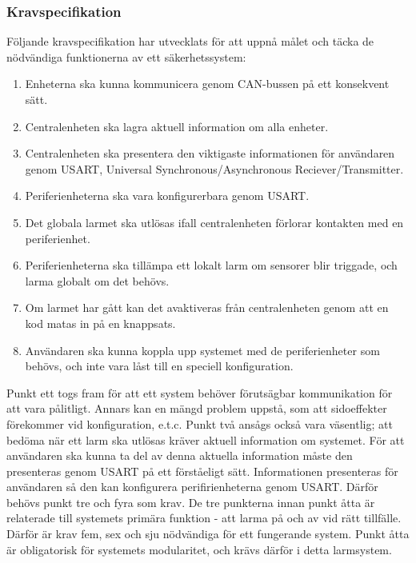 \subsubsection{Kravspecifikation}
\label{sec:kravspec}
Följande kravspecifikation har utvecklats för att uppnå målet och täcka de nödvändiga funktionerna av ett säkerhetssystem:
\begin{enumerate}
    \item Enheterna ska kunna kommunicera genom CAN-bussen på ett konsekvent sätt.
    \label{itm:krav1}
    \item Centralenheten ska lagra aktuell information om alla enheter.
    \label{itm:krav2}
    \item Centralenheten ska presentera den viktigaste informationen för 
    användaren genom USART, Universal Synchronous/Asynchronous Reciever/Transmitter.
    \label{itm:krav3}
    \item Periferienheterna ska vara konfigurerbara genom USART.
    \label{itm:krav4}
    \item Det globala larmet ska utlösas ifall centralenheten förlorar kontakten med en periferienhet.
    \label{itm:krav5}
    \item Periferienheterna ska tillämpa ett lokalt larm om sensorer blir triggade, och larma globalt om det behövs.
    \label{itm:krav6}
    \item Om larmet har gått kan det avaktiveras från centralenheten genom att en kod matas in på en knappsats.
    \label{itm:krav7}
    \item Användaren ska kunna koppla upp systemet med de periferienheter som behövs, och inte vara låst till en speciell konfiguration.
    \label{itm:krav8}
\end{enumerate}
Punkt ett togs fram för att ett system behöver förutsägbar kommunikation för att vara pålitligt. Annars kan en mängd problem uppstå, som att sidoeffekter förekommer vid konfiguration, e.t.c. Punkt två ansågs också vara väsentlig; att bedöma när ett larm ska utlösas kräver aktuell information om systemet. För att användaren ska kunna ta del av denna aktuella information måste den presenteras genom USART på ett förståeligt sätt. Informationen presenteras för användaren så den kan konfigurera perifirienheterna genom USART. Därför behövs punkt tre och fyra som krav.
De tre punkterna innan punkt åtta är relaterade till systemets primära funktion - att larma på och av vid rätt tillfälle. Därför är krav fem, sex och sju nödvändiga för ett fungerande system. 
Punkt åtta är obligatorisk för systemets modularitet, och krävs därför i detta larmsystem.

